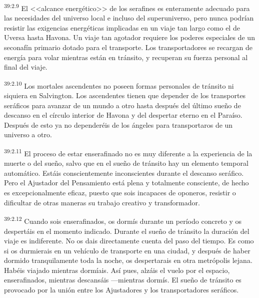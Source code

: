 \par
\textsuperscript{39:2.9} El <<alcance energético>> de los serafines es enteramente adecuado para las necesidades del universo local e incluso del superuniverso, pero nunca podrían resistir las exigencias energéticas implicadas en un viaje tan largo como el de Uversa hasta Havona. Un viaje tan agotador requiere los poderes especiales de un seconafín primario dotado para el transporte. Los transportadores se recargan de energía para volar mientras están en tránsito, y recuperan su fuerza personal al final del viaje.

\par
\textsuperscript{39:2.10} Los mortales ascendentes no poseen formas personales de tránsito ni siquiera en Salvington. Los ascendentes tienen que depender de los transportes seráficos para avanzar de un mundo a otro hasta después del último sueño de descanso en el círculo interior de Havona y del despertar eterno en el Paraíso. Después de esto ya no dependeréis de los ángeles para transportaros de un universo a otro.

\par
\textsuperscript{39:2.11} El proceso de estar enserafinado no es muy diferente a la experiencia de la muerte o del sueño, salvo que en el sueño de tránsito hay un elemento temporal automático. Estáis conscientemente inconscientes durante el descanso seráfico. Pero el Ajustador del Pensamiento está plena y totalmente consciente, de hecho es excepcionalmente eficaz, puesto que sois incapaces de oponeros, resistir o dificultar de otras maneras su trabajo creativo y transformador.

\par
\textsuperscript{39:2.12} Cuando sois enserafinados, os dormís durante un período concreto y os despertáis en el momento indicado. Durante el sueño de tránsito la duración del viaje es indiferente. No os dais directamente cuenta del paso del tiempo. Es como si os durmierais en un vehículo de transporte en una ciudad, y después de haber dormido tranquilamente toda la noche, os despertarais en otra metrópolis lejana. Habéis viajado mientras dormíais. Así pues, alzáis el vuelo por el espacio, enserafinados, mientras descansáis ---mientras dormís. El sueño de tránsito es provocado por la unión entre los Ajustadores y los transportadores seráficos.

